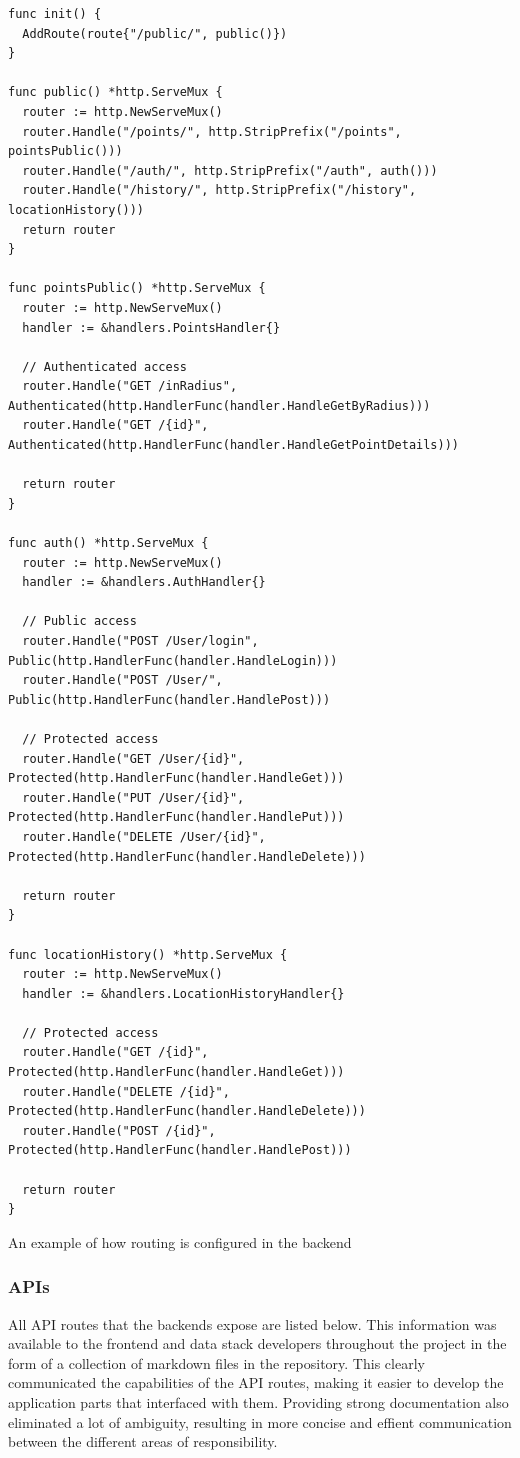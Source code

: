 \begin{listing}[htbp]
  \begin{verbatim}
func init() {
  AddRoute(route{"/public/", public()})
}

func public() *http.ServeMux {
  router := http.NewServeMux()
  router.Handle("/points/", http.StripPrefix("/points", pointsPublic()))
  router.Handle("/auth/", http.StripPrefix("/auth", auth()))
  router.Handle("/history/", http.StripPrefix("/history", locationHistory()))
  return router
}

func pointsPublic() *http.ServeMux {
  router := http.NewServeMux()
  handler := &handlers.PointsHandler{}

  // Authenticated access
  router.Handle("GET /inRadius", Authenticated(http.HandlerFunc(handler.HandleGetByRadius)))
  router.Handle("GET /{id}", Authenticated(http.HandlerFunc(handler.HandleGetPointDetails)))

  return router
}

func auth() *http.ServeMux {
  router := http.NewServeMux()
  handler := &handlers.AuthHandler{}

  // Public access
  router.Handle("POST /User/login", Public(http.HandlerFunc(handler.HandleLogin)))
  router.Handle("POST /User/", Public(http.HandlerFunc(handler.HandlePost)))

  // Protected access
  router.Handle("GET /User/{id}", Protected(http.HandlerFunc(handler.HandleGet)))
  router.Handle("PUT /User/{id}", Protected(http.HandlerFunc(handler.HandlePut)))
  router.Handle("DELETE /User/{id}", Protected(http.HandlerFunc(handler.HandleDelete)))

  return router
}

func locationHistory() *http.ServeMux {
  router := http.NewServeMux()
  handler := &handlers.LocationHistoryHandler{}

  // Protected access
  router.Handle("GET /{id}", Protected(http.HandlerFunc(handler.HandleGet)))
  router.Handle("DELETE /{id}", Protected(http.HandlerFunc(handler.HandleDelete)))
  router.Handle("POST /{id}", Protected(http.HandlerFunc(handler.HandlePost)))

  return router
}
  \end{verbatim}
  \caption{An example of how routing is configured in the backend}
  \label{listing:routing_example}
\end{listing}

\newpage{}

\subsubsection{APIs}
All API routes that the backends expose are listed below. This information was
available to the frontend and data stack developers throughout the project in
the form of a collection of markdown files in the repository. This clearly
communicated the capabilities of the API routes, making it easier to develop the
application parts that interfaced with them. Providing strong documentation also
eliminated a lot of ambiguity, resulting in more concise and effient
communication between the different areas of responsibility.

